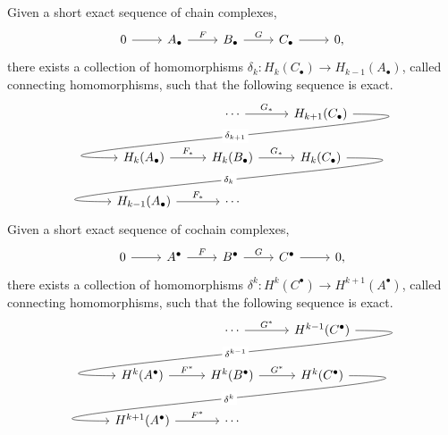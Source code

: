 \documentclass[a4paper,12pt]{article}
\begin{document}
\begin{lemma}\label{lem:zig-zag_lemma}
    Given a short exact sequence of chain complexes,
    \[\begin{tikzcd}
	0 & {A_\bullet} & {B_\bullet} & {C_\bullet} & 0,
	\arrow[from=1-1, to=1-2]
	\arrow["F", from=1-2, to=1-3]
	\arrow["G", from=1-3, to=1-4]
	\arrow[from=1-4, to=1-5]
    \end{tikzcd}\]
    there exists a collection of homomorphisms $\delta_k \colon H_k(C_\bullet) \to H_{k-1}(A_\bullet)$, called connecting homomorphisms, such that the following sequence is exact.
    \[\begin{tikzcd}
    & \cdots \ar[r, "G_*"] & H_{k+1}(C_\bullet) \ar[out=0, in=180, looseness=2, overlay, lld, "\delta_{k+1}"{description}]\\
    H_k(A_\bullet) \ar[r, "F_*"] & H_k(B_\bullet) \ar[r, "G_*"] & H_k(C_\bullet) \ar[out=0, in=180, looseness=2, overlay, lld, "\delta_k"{description}]\\
    H_{k-1}(A_\bullet) \ar[r, "F_*"] & \cdots &
    \end{tikzcd}\]
    Given a short exact sequence of cochain complexes,
    \[\begin{tikzcd}
	0 & {A^\bullet} & {B^\bullet} & {C^\bullet} & 0,
	\arrow[from=1-1, to=1-2]
	\arrow["F", from=1-2, to=1-3]
	\arrow["G", from=1-3, to=1-4]
	\arrow[from=1-4, to=1-5]
    \end{tikzcd}\]
    there exists a collection of homomorphisms $\delta^k \colon H^k(C^\bullet) \to H^{k+1}(A^\bullet)$, called connecting homomorphisms, such that the following sequence is exact.
    \[\begin{tikzcd}
    & \cdots \ar[r, "G^*"] & H^{k-1}(C^\bullet) \ar[out=0, in=180, looseness=2, overlay, lld, "\delta^{k-1}"{description}]\\
    H^k(A^\bullet) \ar[r, "F^*"] & H^k(B^\bullet) \ar[r, "G^*"] & H^k(C^\bullet) \ar[out=0, in=180, looseness=2, overlay, lld, "\delta^k"{description}]\\
    H^{k+1}(A^\bullet) \ar[r, "F^*"] & \cdots &
    \end{tikzcd}\]
\end{lemma}
\end{document}
